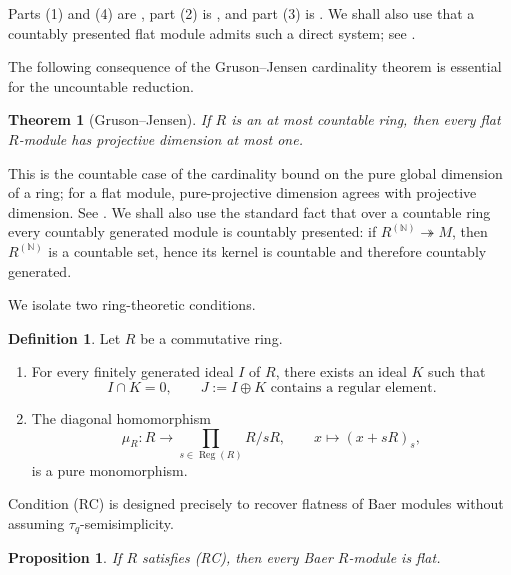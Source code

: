 \documentclass[11pt]{article}
\newtheorem{theorem}{Theorem}[section]
\newtheorem{proposition}[proposition]{Proposition}
\theoremstyle{definition}
\newtheorem{definition}[definition]{Definition}
\theoremstyle{remark}
\newcommand{\Reg}{\operatorname{Reg}}
\begin{document}
Parts (1) and (4) are \cite[Proposition~2.5]{ABH}, part (2) is
\cite[Corollary~2.6]{ABH}, and part (3) is \cite[Proposition~2.9]{ABH}.
We shall also use that a countably presented flat module admits such a direct
system; see \cite[Proposition~3.1]{ABH}.

The following consequence of the Gruson--Jensen cardinality theorem is
essential for the uncountable reduction.

\begin{theorem}[Gruson--Jensen]\label{thm:GJ}
If $R$ is an at most countable ring, then every flat $R$-module has projective
dimension at most one.
\end{theorem}

This is the countable case of the cardinality bound on the pure global
dimension of a ring; for a flat module, pure-projective dimension agrees with
projective dimension.  See \cite{GrusonJensen}.  We shall also use the
standard fact that over a countable ring every countably generated module is
countably presented: if $R^{(\mathbb N)}\twoheadrightarrow M$, then
$R^{(\mathbb N)}$ is a countable set, hence its kernel is countable and
therefore countably generated.



We isolate two ring-theoretic conditions.

\begin{definition}\label{def:RCPE}
Let $R$ be a commutative ring.
\begin{enumerate}[label=\textup{(\mathrm{RC})}]
\item[(RC)] For every finitely generated ideal $I$ of $R$, there exists an ideal
$K$ such that
\[
 I\cap K=0,\qquad J:=I\oplus K\text{ contains a regular element.}
\]
\item[(PE)] The diagonal homomorphism
\begin{equation}\label{eq:mu}
 \mu_R:R\longrightarrow \prod_{s\in\Reg(R)}R/sR,
 \qquad x\longmapsto (x+sR)_s,
\end{equation}
is a pure monomorphism.
\end{enumerate}
\end{definition}

Condition (RC) is designed precisely to recover flatness of Baer modules
without assuming $\tau_q$-semisimplicity.

\begin{proposition}\label{prop:flat}
If $R$ satisfies \textup{(RC)}, then every Baer $R$-module is flat.
\end{proposition}
\end{document}
